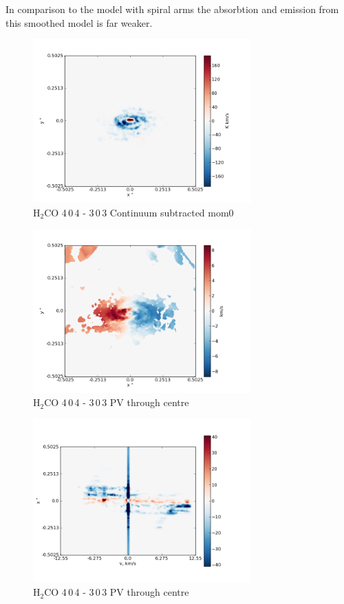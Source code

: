 \documentclass[useAMS,usenatbib]{mn2e}
\begin{document}
In comparison to the model with spiral arms the absorbtion and emission from this smoothed model is far weaker.\newline

\begin{figure}
 \includegraphics[width=84mm]{Figures/sim/imageH2CO_4-0-4->3-0-3_30deg_contSub.png}

 \caption{H$_2$CO 4$\,$0$\,$4 - 3$\,$0$\,$3 Continuum subtracted mom0}
\end{figure}

\begin{figure}
 \includegraphics[width=84mm]{Figures/sim/imageH2CO_4-0-4->3-0-3_30deg_mom1.png}

 \caption{H$_2$CO 4$\,$0$\,$4 - 3$\,$0$\,$3 PV through centre}
\end{figure}

\begin{figure}
 \includegraphics[width=84mm]{Figures/sim/imageH2CO_4-0-4->3-0-3_30deg_PV_centre.png}

 \caption{H$_2$CO 4$\,$0$\,$4 - 3$\,$0$\,$3 PV through centre}
\end{figure}
\end{document}
